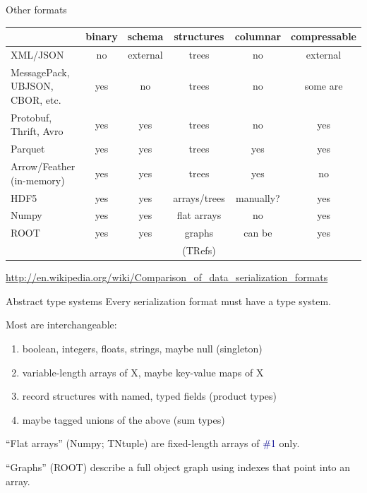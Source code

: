 \documentclass{beamer}
\begin{document}
\begin{frame}{Other formats}
\vspace{0.25 cm}
\renewcommand{\arraystretch}{1.2}
\mbox{\hspace{-0.8 cm}}\begin{tabular}{p{2 cm} c c c c c}
                          & binary & schema     & structures   & columnar & compressable\\\hline
XML/JSON                  & no     & external   & trees        & no       & external    \\
MessagePack, UBJSON, CBOR, etc.   & yes    & no         & trees        & no       & some are    \\
Protobuf, Thrift, Avro    & yes    & yes        & trees        & no       & yes         \\
Parquet                   & yes    & yes        & trees        & yes      & yes         \\
Arrow/Feather (in-memory) & yes    & yes        & trees        & yes      & no          \\
HDF5                      & yes    & yes        & arrays/trees & manually?& yes         \\
Numpy                     & yes    & yes        & flat arrays  & no       & yes         \\
ROOT                      & yes    & yes        & graphs       & can be   & yes         \\
                          &        &            & (TRefs)      &          &             \\
\end{tabular}

\vspace{0.25 cm}
\scriptsize \mbox{\hspace{-0.5 cm}\textcolor{blue}{\url{http://en.wikipedia.org/wiki/Comparison_of_data_serialization_formats}}}
\end{frame}

\begin{frame}{Abstract type systems}
\vspace{0.5 cm}
Every serialization format must have a type system.

\vspace{0.5 cm}
Most are interchangeable:
\begin{enumerate}
\item boolean, integers, floats, strings, maybe null (singleton)
\item variable-length arrays of X, maybe key-value maps of X
\item record structures with named, typed fields (product types)
\item maybe tagged unions of the above (sum types)
\end{enumerate}

\vspace{0.5 cm}
``Flat arrays'' (Numpy; TNtuple) are fixed-length arrays of \textcolor{darkblue}{\#1} only.

\vspace{0.5 cm}
``Graphs'' (ROOT) describe a full object graph using indexes that point into an array.
\end{frame}
\end{document}
